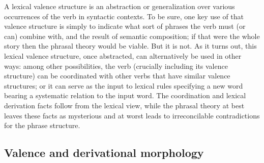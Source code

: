 A lexical valence structure is an abstraction or generalization over various occurrences of the verb
in syntactic contexts.  To be sure, one key use of that valence structure is simply to indicate what
sort of phrases the verb must (or can) combine with, and the result of semantic composition; if that
were the whole story then the phrasal theory would be viable.  But it is not.  As it turns out, this
lexical valence structure, once abstracted, can alternatively be used in other ways: among other
possibilities, the verb (crucially including its valence structure) can be coordinated with other
verbs that have similar valence structures; or it can serve as the input to lexical rules
specifying a new word bearing a systematic relation to the input word.  The coordination and lexical
derivation facts follow from the lexical view, while the phrasal theory at best leaves these facts
as mysterious and at worst leads to irreconcilable contradictions for the phrase structure.   


%
%
%


\subsection{Valence and derivational morphology}
\label{sec-val-morph}\label{sec-phrasal-LI}\label{sec-inheritance-passive-LFG}

